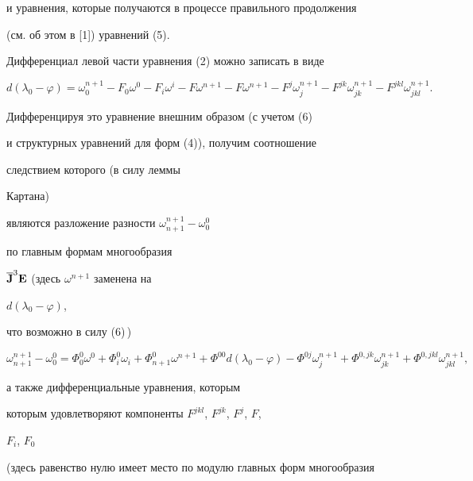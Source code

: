 и уравнения, которые получаются в процессе правильного продолжения 


(см. об этом в [1]) уравнений (5). 


 


 


Дифференциал левой части уравнения (2) можно записать в виде 


\begin{equation} 


d(\lambda_0-\varphi)=\omega^{n+1}_0-F_0\omega^0- 


F_i\omega^i-F\omega^{n+1}-F\omega^{n+1}- 


F^j\omega^{n+1}_j-F^{jk}\omega^{n+1}_{jk}- 


F^{jkl}\omega^{n+1}_{jkl}. 


\end{equation} 


Дифференцируя это уравнение внешним образом (с учетом (6) 


и структурных уравнений для форм (4)), получим соотношение 


следствием которого (в силу леммы 


Картана) 


являются разложение разности $\omega^{n+1}_{n+1}-\omega^0_0$ 


по главным формам многообразия 


$\overline{\bold J}^3\bold E$ (здесь $\omega^{n+1}$ заменена на 


$d(\lambda_0-\varphi)$, 


что возможно в силу (6)\,)


\begin{equation} 


\omega^{n+1}_{n+1}-\omega^0_0=\Phi^0_0\omega^0+ 


\Phi^0_i\omega_i+\Phi^0_{n+1}\omega^{n+1} 


+\Phi^{00}d(\lambda_0-\varphi)- 


\Phi^{0j}\omega^{n+1}_j+\Phi^{0,jk}\omega^{n+1}_{jk}+ 


\Phi^{0,jkl}\omega^{n+1}_{jkl}, 


\end{equation} 


а также дифференциальные уравнения, которым 


которым удовлетворяют компоненты $F^{jkl}$, $F^{jk}$, $F^j$, $F$, 


$F_i$, $F_0$ 


(здесь равенство нулю имеет место по модулю главных форм многообразия 


